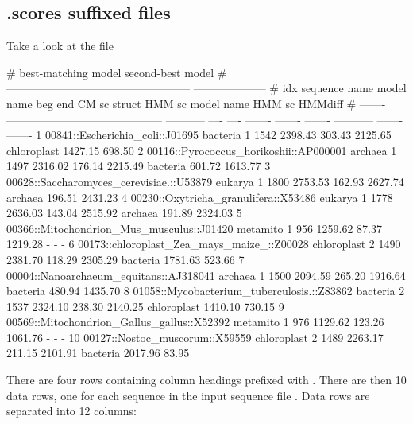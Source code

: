 \subsection{.scores suffixed files}

Take a look at the file 

\begin{sreoutputtinywide}
#                                                                     best-matching model                   second-best model  
#                                                      --------------------------------------------------  --------------------
#     idx  sequence name                               model name    beg   end    CM sc   struct   HMM sc  model name    HMM sc  HMMdiff
# -------  ------------------------------------------  -----------  ----  ----  -------  -------  -------  -----------  -------  -------
        1  00841::Escherichia_coli::J01695             bacteria        1  1542  2398.43   303.43  2125.65  chloroplast  1427.15   698.50
        2  00116::Pyrococcus_horikoshii::AP000001      archaea         1  1497  2316.02   176.14  2215.49  bacteria      601.72  1613.77
        3  00628::Saccharomyces_cerevisiae.::U53879    eukarya         1  1800  2753.53   162.93  2627.74  archaea       196.51  2431.23
        4  00230::Oxytricha_granulifera::X53486        eukarya         1  1778  2636.03   143.04  2515.92  archaea       191.89  2324.03
        5  00366::Mitochondrion_Mus_musculus::J01420   metamito        1   956  1259.62    87.37  1219.28  -                  -        -
        6  00173::chloroplast_Zea_mays_maize_::Z00028  chloroplast     2  1490  2381.70   118.29  2305.29  bacteria     1781.63   523.66
        7  00004::Nanoarchaeum_equitans::AJ318041      archaea         1  1500  2094.59   265.20  1916.64  bacteria      480.94  1435.70
        8  01058::Mycobacterium_tuberculosis.::Z83862  bacteria        2  1537  2324.10   238.30  2140.25  chloroplast  1410.10   730.15
        9  00569::Mitochondrion_Gallus_gallus::X52392  metamito        1   976  1129.62   123.26  1061.76  -                  -        -
       10  00127::Nostoc_muscorum::X59559              chloroplast     2  1489  2263.17   211.15  2101.91  bacteria     2017.96    83.95
\end{sreoutputtinywide}

There are four rows containing column headings prefixed with
\prog{\#}. There are then 10 data rows, one for each sequence in the
input sequence file . Data rows are
separated into 12 columns:

